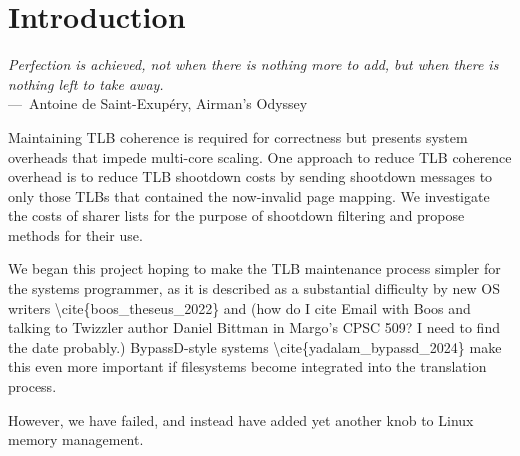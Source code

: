 
\chapter{Introduction}
\label{ch:Introduction}

\begin{epigraph}
	\emph{Perfection is achieved, not when there is nothing more to add, but when there is nothing left to take away.}\\
	---~Antoine de Saint-Exupéry, Airman's Odyssey
\end{epigraph}

Maintaining TLB coherence is required for correctness but presents system overheads that impede multi-core scaling. One approach to reduce TLB coherence  overhead is to reduce TLB shootdown costs by sending shootdown messages to only those TLBs that contained the now-invalid page mapping. We investigate the costs of sharer lists for the purpose of shootdown filtering and propose methods for their use.

We began this project hoping to make the TLB maintenance process simpler for the systems programmer, as it is described as a substantial difficulty by new OS writers \textbackslash{}cite\{boos\_theseus\_2022\} and (how do I cite Email with Boos and talking to Twizzler author Daniel Bittman in Margo's CPSC 509? I need to find the date probably.) BypassD-style systems \textbackslash{}cite\{yadalam\_bypassd\_2024\} make this even more important if filesystems become integrated into the translation process.

However, we have failed, and instead have added yet another knob to Linux memory management.


\endinput
